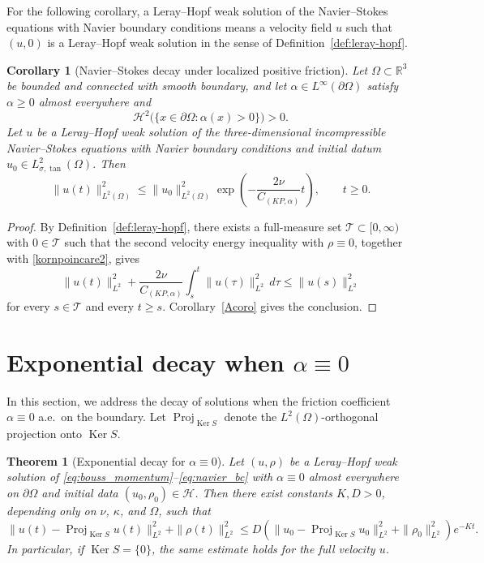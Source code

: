 \documentclass[11pt,reqno]{amsart}
\theoremstyle{plain}
\newtheorem{corollary}[thm]{Corollary}
\newtheorem{theorem}[thm]{Theorem}
\numberwithin{equation}{section}
\DeclareMathOperator{\kernel}{Ker}
\DeclareMathOperator{\Proj}{Proj}
\begin{document}
For the following corollary, a Leray--Hopf weak solution of the Navier--Stokes equations with Navier boundary conditions means a velocity field $u$ such that $(u,0)$ is a Leray--Hopf weak solution in the sense of Definition~\ref{def:leray-hopf}.

\begin{corollary}[Navier--Stokes decay under localized positive friction]\label{cor:NS-decay}
Let $\Omega\subset\mathbb R^3$ be bounded and connected with smooth boundary, and let $\alpha\in L^\infty(\partial\Omega)$ satisfy $\alpha\ge0$ almost everywhere and
\[
\mathcal H^2\bigl(\{x\in\partial\Omega:\alpha(x)>0\}\bigr)>0.
\]
Let $u$ be a Leray--Hopf weak solution of the three-dimensional incompressible Navier--Stokes equations with Navier boundary conditions and initial datum $u_0\in L^2_{\sigma,\tan}(\Omega)$. Then
\[
\|u(t)\|_{L^2(\Omega)}^2
\le \|u_0\|_{L^2(\Omega)}^2
\exp\left(-\frac{2\nu}{C_{(KP,\alpha)}}t\right),
\qquad t\ge0.
\]
\end{corollary}
\begin{proof}
By Definition~\ref{def:leray-hopf}, there exists a full-measure set $\mathcal T\subset[0,\infty)$ with $0\in\mathcal T$ such that the second velocity energy inequality with $\rho\equiv0$, together with \eqref{kornpoincare2}, gives
\[
\|u(t)\|_{L^2}^2+\frac{2\nu}{C_{(KP,\alpha)}}\int_s^t\|u(\tau)\|_{L^2}^2\,d\tau
\le \|u(s)\|_{L^2}^2
\]
for every $s\in\mathcal T$ and every $t\ge s$. Corollary~\ref{Acoro} gives the conclusion.
\end{proof}

\section{Exponential decay when $\alpha\equiv 0$}\label{sec6}
In this section, we address the decay of solutions when the friction coefficient $\alpha\equiv 0$ a.e.\ on the boundary. Let $\Proj_{\kernel S}$ denote the $L^2(\Omega)$-orthogonal projection onto $\kernel S$.

\begin{theorem}[Exponential decay for $\alpha\equiv0$]
\label{thm:decay_alpha_zero}
Let $(u,\rho)$ be a Leray--Hopf weak solution of \eqref{eq:bouss_momentum}--\eqref{eq:navier_bc} with $\alpha\equiv0$ almost everywhere on $\partial\Omega$ and initial data $(u_0,\rho_0)\in\mathcal H$. Then there exist constants $K,D>0$, depending only on $\nu$, $\kappa$, and $\Omega$, such that
\[
\|u(t)-\Proj_{\kernel S}u(t)\|_{L^2}^2+\|\rho(t)\|_{L^2}^2
\le D\left(\|u_0-\Proj_{\kernel S}u_0\|_{L^2}^2+\|\rho_0\|_{L^2}^2\right)e^{-Kt}.
\]
In particular, if $\kernel S=\{0\}$, the same estimate holds for the full velocity $u$.
\end{theorem}
\end{document}
